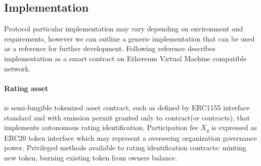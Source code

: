 \documentclass{article}
\begin{document}
\begin{CJK}{UTF8}{gbsn}
\begin{multicols}{2}
            
            \section{Implementation}
            Protocol particular implementation may vary depending on environment and requirements, however we can outline a generic implementation that can be used as a reference for further development. Following reference describes implementation as a smart contract on Ethereum Virtual Machine compatible network.
            \paragraph{Rating asset}
            is semi-fungible tokenized asset contract, such as defined by ERC1155\cite{EIP1155} interface standard and with emission permit granted only to contract(or contracts), that implements autonomous rating identification. Participation fee $X_g$ is expressed as ERC20\cite{EIP20} token interface which may represent a overseeing organization governance power.
            Privileged methods available to rating identification contracts: minting new token, burning existing token from owners balance.


\end{multicols}
\end{CJK}
\end{document}
